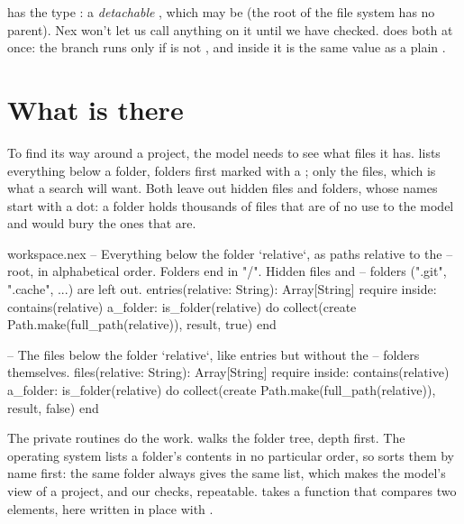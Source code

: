  has the type : a \emph{detachable}
, which may be  (the root of the file system has no
parent). Nex won't let us call anything on it until we have checked.
 does both at once: the branch runs only
if  is not , and inside it  is the
same value as a plain .

\section{What is there}

To find its way around a project, the model needs to see what files it
has.  lists everything below a folder, folders first marked
with a \code{/};  only the files, which is what a search will
want. Both leave out hidden files and folders, whose names start with a
dot: a  folder holds thousands of files that are of no use to
the model and would bury the ones that are.

\begin{continued}{workspace.nex}
  -- Everything below the folder `relative`, as paths relative to the
  -- root, in alphabetical order. Folders end in "/". Hidden files and
  -- folders (".git", ".cache", ...) are left out.
  entries(relative: String): Array[String]
  require
    inside: contains(relative)
    a_folder: is_folder(relative)
  do
    collect(create Path.make(full_path(relative)), result, true)
  end

  -- The files below the folder `relative`, like entries but without the
  -- folders themselves.
  files(relative: String): Array[String]
  require
    inside: contains(relative)
    a_folder: is_folder(relative)
  do
    collect(create Path.make(full_path(relative)), result, false)
  end
\end{continued}

The private routines do the work.  walks the folder tree,
depth first. The operating system lists a folder's contents in no
particular order, so  sorts them by name first: the same
folder always gives the same list, which makes the model's view of a
project, and our checks, repeatable.  takes a function that
compares two elements, here written in place with .

